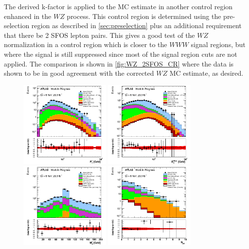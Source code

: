 The derived k-factor is applied to the MC estimate in another control
region enhanced in the $WZ$ process. This control region is determined
using the pre-selection region as described in \sec\ref{sec:preselection}
plus an additional requirement that there be 2 SFOS lepton pairs.
This gives a good test of the $WZ$ normalization in a control region
which is closer to the $WWW$ signal regions, but where the signal is still
suppressed since most of the signal region cuts are not applied.
The comparison is shown in \fig\ref{fig:WZ_2SFOS_CR} where
the data is shown to be in good agreement with the corrected $WZ$ MC
estimate, as desired.

\begin{figure}[htp]
\centering
\includegraphics[width=0.4\textwidth]{figures/WZ_CR/LeadingLeptonPt_histratio.png}
\includegraphics[width=0.4\textwidth]{figures/WZ_CR/MET_Et_histratio.png}
\includegraphics[width=0.4\textwidth]{figures/WZ_CR/InvariantMassSFOS_histratio.png}
\includegraphics[width=0.4\textwidth]{figures/WZ_CR/NJets_histratio.png}

\end{figure}
